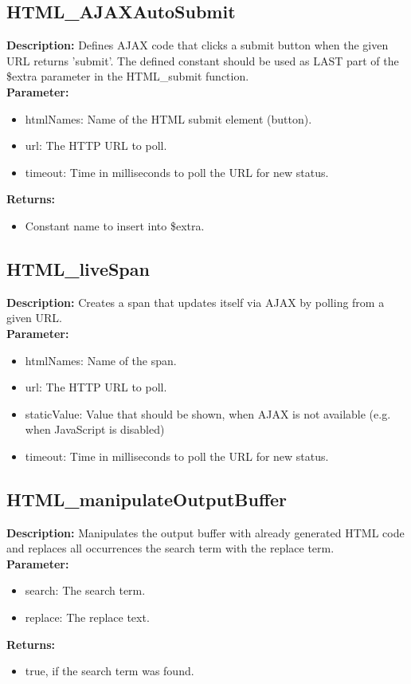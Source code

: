 \subsection{HTML\_AJAXAutoSubmit}
\textbf{Description:} Defines AJAX code that clicks a submit button when the given URL returns 'submit'. The defined constant should be used as LAST part of the \$extra parameter in the HTML\_submit function.\\
\textbf{Parameter:}
\begin{itemize}
\item htmlNames: Name of the HTML submit element (button).
\item url: The HTTP URL to poll.
\item timeout: Time in milliseconds to poll the URL for new status.
\end{itemize}
\textbf{Returns:}
\begin{itemize}
\item Constant name to insert into \$extra.
\end{itemize}

\subsection{HTML\_liveSpan}
\textbf{Description:} Creates a span that updates itself via AJAX by polling from a given URL.\\
\textbf{Parameter:}
\begin{itemize}
\item htmlNames: Name of the span.
\item url: The HTTP URL to poll.
\item staticValue: Value that should be shown, when AJAX is not available (e.g. when JavaScript is disabled)
\item timeout: Time in milliseconds to poll the URL for new status.
\end{itemize}

\subsection{HTML\_manipulateOutputBuffer}
\textbf{Description:} Manipulates the output buffer with already generated HTML code and replaces all occurrences the search term with the replace term.\\
\textbf{Parameter:}
\begin{itemize}
\item search: The search term.
\item replace: The replace text.
\end{itemize}
\textbf{Returns:}
\begin{itemize}
\item true, if the search term was found.
\end{itemize}

